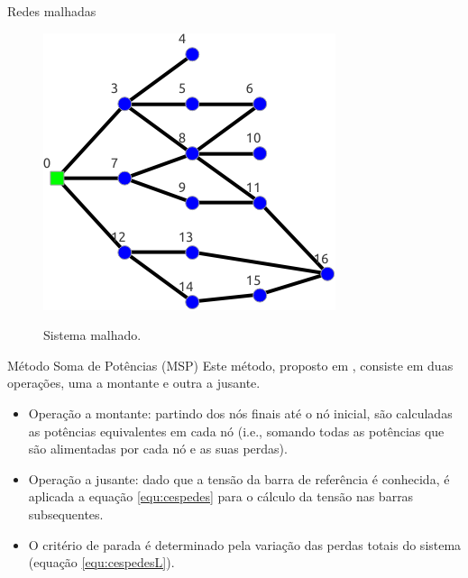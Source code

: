 \documentclass[10pt]{beamer}
\begin{document}
\begin{frame}{Redes malhadas}
    \begin{figure}[H]
        \centering
        \caption{Sistema malhado.}
        \includegraphics[scale=0.6]{img/malhado}
        \label{fig:malhado}
    \end{figure}
\end{frame}

\begin{frame}{Método Soma de Potências (MSP)}
    Este método, proposto em \citep{Cespedes}, consiste em duas operações, uma a montante e outra a jusante. 
    
    \begin{itemize}
        \item Operação a montante: partindo dos nós finais até o nó inicial, são calculadas as potências equivalentes em cada nó (i.e., somando todas as potências que são alimentadas por cada nó e as suas perdas).
        
        \item Operação a jusante: dado que a tensão da barra de referência é conhecida, é aplicada a equação \ref{equ:cespedes} para o cálculo da tensão nas barras subsequentes.
        
        \item O critério de parada é determinado pela variação das perdas totais do sistema (equação \ref{equ:cespedesL}).
    \end{itemize}
\end{frame}
\end{document}

